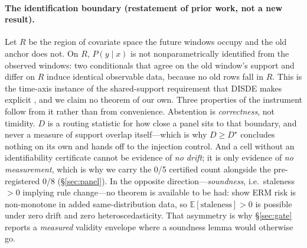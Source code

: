 \documentclass[10pt]{article} %
\begin{document}
\paragraph{The identification boundary (restatement of prior work, not a new result).}
Let $R$ be the region of covariate space the future windows occupy and the old anchor does not. On
$R$, $P(y \mid x)$ is not nonparametrically identified from the observed windows: two conditionals
that agree on the old window's support and differ on $R$ induce identical observable data, because
no old rows fall in $R$. This is the time-axis instance of the shared-support requirement that
DISDE makes explicit \citep[Prop.~1]{cai2023disde}, and we claim no theorem of our own. Three
properties of the instrument follow from it rather than from convenience. Abstention is
\emph{correctness}, not timidity. $D$ is a routing statistic for how close a panel sits to that
boundary, and never a measure of support overlap itself---which is why $D \geq D^\star$ concludes
nothing on its own and hands off to the injection control. And a cell without an identifiability
certificate cannot be evidence of \emph{no drift}; it is only evidence of \emph{no measurement},
which is why we carry the 0/5 certified count alongside the pre-registered 0/8
(\S\ref{sec:panel}). In the opposite direction---\emph{soundness}, i.e.\ staleness $>0$ implying
rule change---no theorem is available to be had: \citet{loog2019minimizers} show ERM risk is
non-monotone in added same-distribution data, so $\mathbb{E}[\text{staleness}] > 0$ is possible
under zero drift and zero heteroscedasticity. That asymmetry is why \S\ref{sec:gate} reports a
\emph{measured} validity envelope where a soundness lemma would otherwise go.
\end{document}
